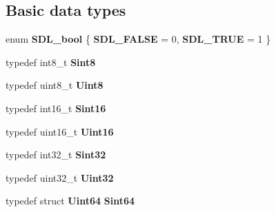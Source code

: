 \subsection*{Basic data types}
\begin{DoxyCompactItemize}
\item 
enum {\bfseries S\+D\+L\+\_\+bool} \{ {\bfseries S\+D\+L\+\_\+\+F\+A\+L\+S\+E} = 0, 
{\bfseries S\+D\+L\+\_\+\+T\+R\+U\+E} = 1
 \}\label{_s_d_l__stdinc_8h_a8fca68df0f976765230fe589a7c7733b}

\item 
typedef int8\+\_\+t {\bfseries Sint8}\label{_s_d_l__stdinc_8h_a5fc98623306a32e69eaab63e89e1d138}

\item 
typedef uint8\+\_\+t {\bfseries Uint8}\label{_s_d_l__stdinc_8h_a2944638813a090aa23e62f4da842c3e2}

\item 
typedef int16\+\_\+t {\bfseries Sint16}\label{_s_d_l__stdinc_8h_a9d0257032c0e146ab6121bf0122712f5}

\item 
typedef uint16\+\_\+t {\bfseries Uint16}\label{_s_d_l__stdinc_8h_a31fcc0a076c9068668173ee26d33e42b}

\item 
typedef int32\+\_\+t {\bfseries Sint32}\label{_s_d_l__stdinc_8h_a7a90b941db9d4582e9ad7abb9940ff7e}

\item 
typedef uint32\+\_\+t {\bfseries Uint32}\label{_s_d_l__stdinc_8h_add440eff171ea5f55cb00c4a9ab8672d}

\item 
typedef struct {\bf Uint64} {\bfseries Sint64}\label{_s_d_l__stdinc_8h_a55b4614d5b29ccdd1d01742ef1f86185}

\end{DoxyCompactItemize}
